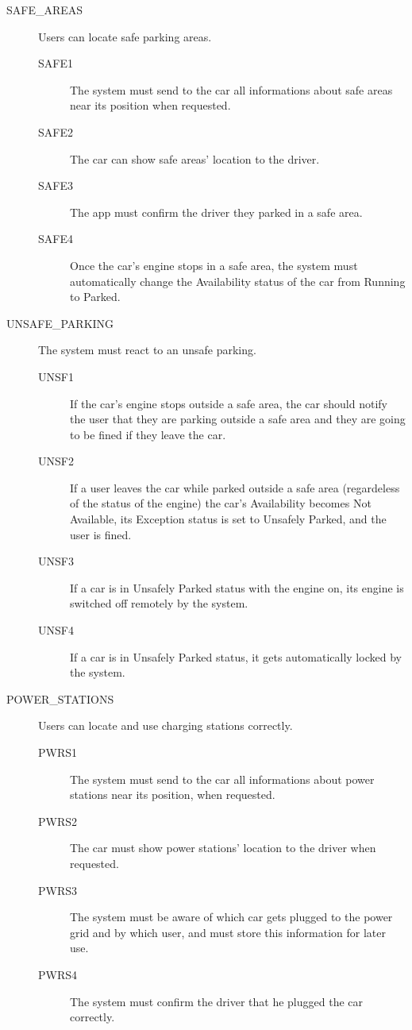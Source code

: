 \documentclass[11pt]{article} %
\begin{document}
\begin{description}
	\item[SAFE\_AREAS] Users can locate safe parking areas.
	\begin{description}
	\item[SAFE1] The system must send to the car all informations about safe areas near its position when requested.
	\item[SAFE2] The car can show safe areas' location to the driver.
	\item[SAFE3] The app must confirm the driver they parked in a safe area.
	\item[SAFE4] Once the car's engine stops in a safe area, the system must automatically change the Availability status of the car from Running to Parked.
	\end{description}

	\item[UNSAFE\_PARKING] The system must react to an unsafe parking.
	\begin{description}
	\item[UNSF1] If the car's engine stops outside a safe area, the car should notify the user that they are parking outside a safe area and they are going to be fined if they leave the car.
	\item[UNSF2] If a user leaves the car while parked outside a safe area (regardeless of the status of the engine) the car's Availability becomes Not Available, its Exception status is set to Unsafely Parked, and the user is fined.
	\item[UNSF3] If a car is in Unsafely Parked status with the engine on, its engine is switched off remotely by the system.
	\item[UNSF4] If a car is in Unsafely Parked status, it gets automatically locked by the system.
	\end{description}

	\item[POWER\_STATIONS] Users can locate and use charging stations correctly.
	\begin{description}
	\item[PWRS1] The system must send to the car all informations about power stations near its position, when requested.
	\item[PWRS2] The car must show power stations' location to the driver when requested.
	\item[PWRS3] The system must be aware of which car gets plugged to the power grid and by which user, and must store this information for later use.
	\item[PWRS4] The system must confirm the driver that he plugged the car correctly.
	\end{description}


\end{description}
\end{document}
